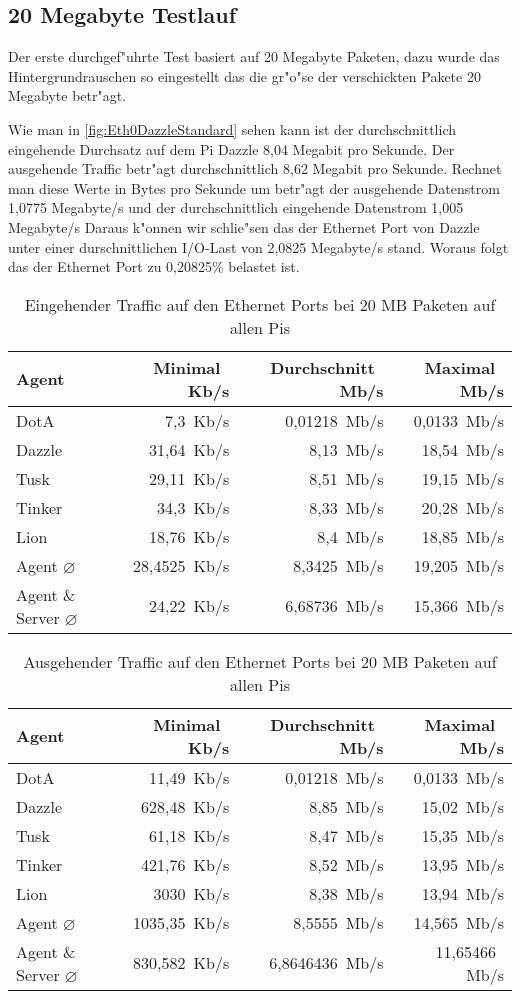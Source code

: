 \subsection{20 Megabyte Testlauf}
\label{subsec:20MBTest}
Der erste durchgef"uhrte Test basiert auf 20 Megabyte Paketen, dazu wurde das Hintergrundrauschen %
so eingestellt das die gr"o"se der verschickten Pakete 20 Megabyte betr"agt. 

Wie man in \cref{fig:Eth0DazzleStandard} sehen kann ist der durchschnittlich eingehende Durchsatz auf dem Pi Dazzle 8,04 Megabit %
pro Sekunde. Der ausgehende Traffic betr"agt durchschnittlich 8,62 Megabit pro Sekunde. Rechnet man diese Werte in Bytes pro Sekunde um %
betr"agt der ausgehende Datenstrom 1,0775 Megabyte/s und der durchschnittlich eingehende Datenstrom 1,005 Megabyte/s %
Daraus k"onnen wir schlie"sen das der Ethernet Port von Dazzle unter einer durschnittlichen I/O-Last von 2,0825 Megabyte/s stand. %
Woraus folgt das der Ethernet Port zu 0,20825\% belastet ist.
\begin{table}
\centering
\begin{tabular}{l%
 r<{\,Kb/s}%
 r<{\,Mb/s}%
 r<{\,Mb/s}%
}
Agent  				& Minimal		& Durchschnitt		& Maximal	\\
\hline
DotA				& 7,3			& 0,01218		& 0,0133	\\		
Dazzle 				& 31,64			& 8,13 			& 18,54		\\
Tusk 				& 29,11			& 8,51			& 19,15		\\
Tinker				& 34,3			& 8,33			& 20,28		\\
Lion				& 18,76			& 8,4			& 18,85		\\ 
Agent $\diameter $	 	& 28,4525		& 8,3425		& 19,205	\\   
Agent \& Server $\diameter$   	& 24,22			& 6,68736		& 15,366	\\ 

\end{tabular}
\caption{Eingehender Traffic auf den Ethernet Ports bei 20 MB Paketen auf allen Pis}
\label{tab:EingehenderTraffic20Mb}
\end{table}

\begin{table}
\centering
\begin{tabular}{l%
 r<{\,Kb/s}%
 r<{\,Mb/s}%
 r<{\,Mb/s}%
}
Agent  				& Minimal		& Durchschnitt		& Maximal	\\	
\hline
DotA				& 11,49			& 0,01218		& 0,0133	\\
Dazzle 				& 628,48		& 8,85	 		& 15,02		\\
Tusk 				& 61,18			& 8,47			& 15,35		\\
Tinker				& 421,76		& 8,52			& 13,95		\\
Lion				& 3030			& 8,38			& 13,94		\\ 
Agent $\diameter $	 	& 1035,35		& 8,5555		& 14,565	\\   
Agent \& Server $\diameter$   	& 830,582		& 6,8646436		& 11,65466	\\ 

\end{tabular}
\caption{Ausgehender Traffic auf den Ethernet Ports bei 20 MB Paketen auf allen Pis}
\label{tab:AusgehenderTraffic20Mb}
\end{table}



